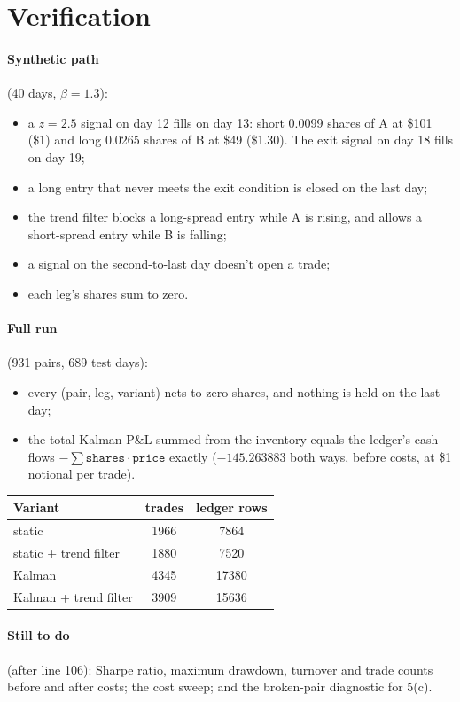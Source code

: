 \documentclass[11pt]{article}
\begin{document}
\section{Verification}

\paragraph{Synthetic path} (40 days, $\beta = 1.3$):
\begin{itemize}
    \item a $z = 2.5$ signal on day 12 fills on day 13: short 0.0099 shares of
    A at \$101 (\$1) and long 0.0265 shares of B at \$49 (\$1.30). The exit
    signal on day 18 fills on day 19;
    \item a long entry that never meets the exit condition is closed on the
    last day;
    \item the trend filter blocks a long-spread entry while A is rising, and
    allows a short-spread entry while B is falling;
    \item a signal on the second-to-last day doesn't open a trade;
    \item each leg's shares sum to zero.
\end{itemize}

\paragraph{Full run} (931 pairs, 689 test days):
\begin{itemize}
    \item every (pair, leg, variant) nets to zero shares, and nothing is held
    on the last day;
    \item the total Kalman P\&L summed from the inventory equals the ledger's
    cash flows $-\sum \texttt{shares}\cdot\texttt{price}$ exactly
    ($-145.263883$ both ways, before costs, at \$1 notional per trade).
\end{itemize}

\begin{center}
\begin{tabular}{lcc}
    \toprule
    Variant & trades & ledger rows \\
    \midrule
    static & 1966 & 7864 \\
    static + trend filter & 1880 & 7520 \\
    Kalman & 4345 & 17380 \\
    Kalman + trend filter & 3909 & 15636 \\
    \bottomrule
\end{tabular}
\end{center}

\paragraph{Still to do} (after line 106): Sharpe ratio, maximum drawdown,
turnover and trade counts before and after costs; the cost sweep; and the
broken-pair diagnostic for 5(c).
\end{document}
